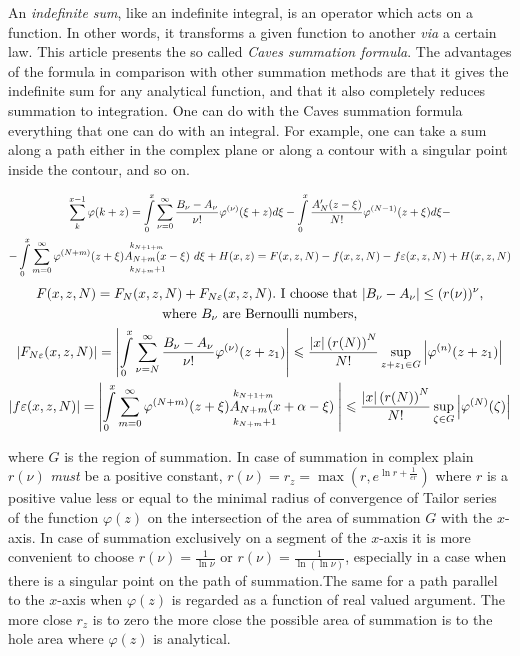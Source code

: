 \documentclass[12pt]{article}
\theoremstyle{plain}
\theoremstyle{definition}
\numberwithin{equation}{section}
\begin{document}
An {\em indefinite sum}, like an indefinite integral, is an operator which acts on a function. In other words, it transforms a given function to another {\em via} a certain law. This article presents the so called {\em Caves summation formula}. The advantages of the formula in comparison with other summation methods are that it gives the indefinite sum for any analytical function, and that it also completely reduces summation to integration.  One can do with the Caves summation formula everything that one can do with an integral. For example, one can take a sum along a path either in the complex plane or along a contour with a singular point inside the contour, and so on.

\begin{multline*}
\sum_{k}^{x-1}\varphi(k+z)=\int\limits_0^x\sum_{\nu=0}^{\infty}\frac{B_{\nu}-A_{\nu}}{\nu!}\varphi^{(\nu)}(\xi+z)d\xi-\int\limits_0^{x}\frac{A_N'(z-\xi)}{N!}\varphi^{(N-1)}(z+\xi)d\xi-\\
-\int\limits_0^{x}\sum_{m=0}^{\infty}\varphi^{(N+m)}(z+\xi)A_{N+m}(x-\xi)\hspace{-5.4em}\rule[-10pt]{0pt}{2.3em}_{k_{N+m}+1}^{k_{N+1+m}}\hspace{2.5em}d\xi+H(x,z)=F(x,z,N)-f(x,z,N)-f\varepsilon(x,z,N)+H(x,z,N)
\end{multline*}
\begin{multline*}
F(x,z,N)=F_N(x,z,N)+F_{N\varepsilon}(x,z,N). \text{\ I choose that\ } |B_{\nu}-A_{\nu}|\leq (r(\nu))^{\nu},\\
\text{where\ }B_{\nu}\text{\ are Bernoulli numbers,}\\
|F_{N\varepsilon}(x,z,N)|=\left|\int\limits_0^x\sum_{\nu=N}^{\infty}\frac{B_{\nu}-A_{\nu}}{\nu!}\varphi^{(\nu)}(z+z_1)\right|\leqslant\frac{|x|\left(r(N)\right)^N}{N!}\sup_{z+z_1\in G}\left|\varphi^{(n)}(z+z_1)\right|\\
|f\varepsilon(x,z,N)|=\left|\int\limits_0^x\sum_{m=0}^{\infty}\varphi^{(N+m)}(z+\xi)A_{N+m}(x+\alpha-\xi)\hspace{-7.5em}\rule[-10pt]{0pt}{2.3em}_{k_{N+m}+1}^{k_{N+1+m}}\quad\qquad\quad\ \,\right|\leqslant\frac{|x|\left(r(N)\right)^N}{N!}\sup_{\zeta\in G}\left|\varphi^{(N)}(\zeta)\right|
\end{multline*}

where $G$ is the region of summation. In case of summation in complex plain $r(\nu)$ \emph{must} be a positive constant, $r(\nu)=r_z=\max\left(r,e^{\ln r+\frac{1}{er}}\right)$ where $r$ is a positive value less or equal to the minimal radius of convergence of Tailor series of the function $\varphi(z)$ on the intersection of the area of summation $G$ with the $x$-axis. In case of summation exclusively on a segment of the $x$-axis it is more convenient to choose $r(\nu)=\frac{1}{\ln\nu}$ or $ r(\nu)=\frac{1}{\ln(\ln\nu)}$, especially in a case when there is a singular point on the path of summation.The same for a path parallel to the $x$-axis when $\varphi(z)$ is regarded as a function of real valued argument. The more close $r_z$ is to zero the more close the possible area of summation is to the hole area where $\varphi(z)$ is analytical.
\end{document}
